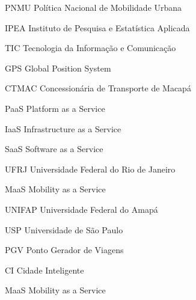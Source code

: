 %
%

\begin{siglas}
    \item[PNMU] Política Nacional de Mobilidade Urbana
    \item[IPEA] Instituto de Pesquisa e Estatística Aplicada
    \item[TIC] Tecnologia da Informação e Comunicação 
    \item[GPS] Global Position System
    \item[CTMAC] Concessionária de Transporte de Macapá
    \item[PaaS] Platform as a Service
    \item[IaaS] Infrastructure as a Service
    \item[SaaS] Software as a Service
    \item[UFRJ] Universidade Federal do Rio de Janeiro
    \item[MaaS] Mobility as a Service
    \item[UNIFAP] Universidade Federal do Amapá
    \item[USP] Universidade de São Paulo
    \item[PGV] Ponto Gerador de Viagens
    \item[CI] Cidade Inteligente
    \item[MaaS] Mobility as a Service 
\end{siglas}
